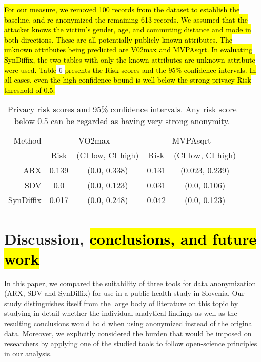 \documentclass[10pt]{article}
\begin{document}
\hl{For our measure, we removed 100 records from the dataset to establish the baseline, and re-anonymized the remaining 613 records. We assumed that the attacker knows the victim's gender, age, and commuting distance and mode in both directions. These are all potentially publicly-known attributes. The unknown attributes being predicted are V02max and MVPAsqrt. In evaluating SynDiffix, the two tables with only the known attributes are unknown attribute were used. Table} 6 \hl{presents the Risk scores and the 95\% confidence intervals. In all cases, even the high confidence bound is well below the strong privacy Risk threshold of 0.5.}


\begin{table}
\begin{center}
\begin{small}
\begin{tabular}{rcccc}
\toprule
Method & \multicolumn{2}{c}{VO2max} & \multicolumn{2}{c}{MVPAsqrt} \\ 
 & Risk & (CI low, CI high) & Risk & (CI low, CI high) \\ 
\midrule
ARX & 0.139 & (0.0, 0.338) & 0.131 & (0.023, 0.239) \\ 
SDV & 0.0 & (0.0, 0.123) & 0.031 & (0.0, 0.106) \\ 
SynDiffix & 0.017 & (0.0, 0.248) & 0.042 & (0.0, 0.123) \\ 
\bottomrule
\end{tabular}
\end{small}
\caption{Privacy risk scores and 95\% confidence intervals. Any risk score below 0.5 can be regarded as having very strong anonymity.}
\label{tab:risk_eval}
\end{center}
\end{table}


\section*{Discussion, \hl{conclusions, and future work}}

In this paper, we compared the suitability of three tools for data anonymization (ARX, SDV and SynDiffix) for use in a public health study in Slovenia. Our study distinguishes itself from the large body of literature on this topic by studying in detail whether the individual analytical findings as well as the resulting conclusions would hold when using anonymized instead of the original data. Moreover, we explicitly considered the burden that would be imposed on researchers by applying one of the studied tools to follow open-science principles in our analysis.
\end{document}
